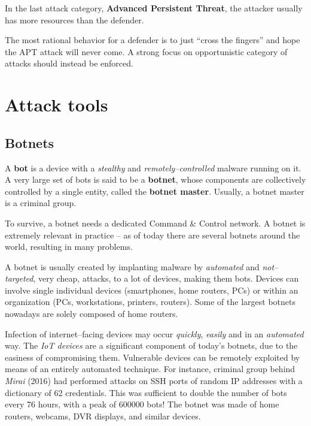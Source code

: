 \documentclass[10pt]{extbook}
\begin{document}
In the last attack category, \textbf{Advanced Persistent Threat}, the attacker
usually has more resources than the defender.

The most rational behavior for a defender is to just ``cross the fingers'' and
hope the APT attack will never come. A strong focus on opportunistic category
of attacks should instead be enforced.

\chapter{Attack tools}

\section{Botnets}

A \textbf{bot} is a device with a \emph{stealthy} and
\emph{remotely--controlled} malware running on it. A very large set of bots is
said to be a \textbf{botnet}, whose components are collectively controlled by a
single entity, called the \textbf{botnet master}. Usually, a botnet master is a
criminal group.

To survive, a botnet needs a dedicated Command \& Control network. A botnet is
extremely relevant in practice -- as of today there are several botnets around
the world, resulting in many problems.

A botnet is usually created by implanting malware by \emph{automated} and
\emph{not--targeted}, very cheap, attacks, to a lot of devices, making them
bots. Devices can involve single individual devices (smartphones, home routers,
PCs) or within an organization (PCs, workstations, printers, routers). Some of
the largest botnets nowadays are solely composed of home routers.

Infection of internet--facing devices may occur \emph{quickly}, \emph{easily}
and in an \emph{automated} way. The \emph{IoT devices} are a significant
component of today's botnets, due to the easiness of compromising them.
Vulnerable devices can be remotely exploited by means of an entirely automated
technique. For instance, criminal group behind \emph{Mirai} (2016) had
performed attacks on SSH ports of random IP addresses with a dictionary of 62
credentials. This was sufficient to double the number of bots every 76 hours,
with a peak of 600000 bots! The botnet was made of home routers, webcams, DVR
displays, and similar devices.
\end{document}
